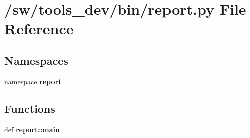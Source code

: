 \section{/sw/tools\_\-dev/bin/report.py File Reference}
\label{report_8py}
\subsection*{Namespaces}
\begin{CompactItemize}
\item 
namespace {\bf report}
\end{CompactItemize}
\subsection*{Functions}
\begin{CompactItemize}
\item 
def {\bf report::main}
\end{CompactItemize}
